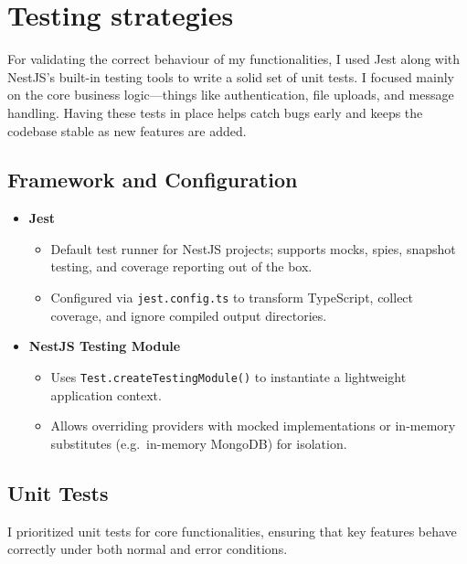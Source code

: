 \section{Testing strategies}

For validating the correct behaviour of my functionalities, I used Jest along with NestJS’s built-in testing tools to write a solid set of unit tests. I focused mainly on the core business logic—things like authentication, file uploads, and message handling. Having these tests in place helps catch bugs early and keeps the codebase stable as new features are added.

\subsection{Framework and Configuration}

\begin{itemize}
  \item \textbf{Jest}  
    \begin{itemize}
      \item Default test runner for NestJS projects; supports mocks, spies, snapshot testing, and coverage reporting out of the box.
      \item Configured via \texttt{jest.config.ts} to transform TypeScript, collect coverage, and ignore compiled output directories.
    \end{itemize}

  \item \textbf{NestJS Testing Module}  
    \begin{itemize}
      \item Uses \texttt{Test.createTestingModule()} to instantiate a lightweight application context.
      \item Allows overriding providers with mocked implementations or in-memory substitutes (e.g.\ in-memory MongoDB) for isolation.
    \end{itemize}
\end{itemize}

\subsection{Unit Tests}

I prioritized unit tests for core functionalities, ensuring that key features behave correctly under both normal and error conditions.

